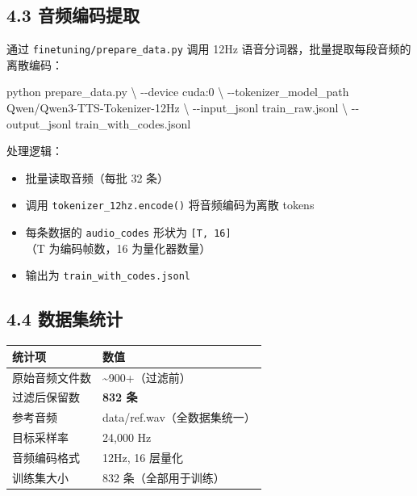 \documentclass[
  english,
  letterpaper,
  DIV=11,
  numbers=noendperiod]{scrartcl}
\newenvironment{Shaded}{\begin{snugshade}}{\end{snugshade}}
\newcommand{\AttributeTok}[1]{\textcolor[rgb]{0.40,0.45,0.13}{#1}}
\newcommand{\DataTypeTok}[1]{\textcolor[rgb]{0.68,0.00,0.00}{#1}}
\newcommand{\ExtensionTok}[1]{\textcolor[rgb]{0.00,0.23,0.31}{#1}}
\newcommand{\NormalTok}[1]{\textcolor[rgb]{0.00,0.23,0.31}{#1}}
\newcounter{none} %
\providecommand{\tightlist}{%
  \setlength{\itemsep}{0pt}\setlength{\parskip}{0pt}}
\begin{document}
\subsection{4.3
音频编码提取}\label{ux97f3ux9891ux7f16ux7801ux63d0ux53d6}

通过 \texttt{finetuning/prepare\_data.py} 调用 12Hz
语音分词器，批量提取每段音频的离散编码：

\begin{Shaded}
\begin{Highlighting}[]
\ExtensionTok{python}\NormalTok{ prepare\_data.py }\DataTypeTok{\textbackslash{}}
  \AttributeTok{{-}{-}device}\NormalTok{ cuda:0 }\DataTypeTok{\textbackslash{}}
  \AttributeTok{{-}{-}tokenizer\_model\_path}\NormalTok{ Qwen/Qwen3{-}TTS{-}Tokenizer{-}12Hz }\DataTypeTok{\textbackslash{}}
  \AttributeTok{{-}{-}input\_jsonl}\NormalTok{ train\_raw.jsonl }\DataTypeTok{\textbackslash{}}
  \AttributeTok{{-}{-}output\_jsonl}\NormalTok{ train\_with\_codes.jsonl}
\end{Highlighting}
\end{Shaded}

处理逻辑：

\begin{itemize}
\tightlist
\item
  批量读取音频（每批 32 条）
\item
  调用 \texttt{tokenizer\_12hz.encode()} 将音频编码为离散 tokens
\item
  每条数据的 \texttt{audio\_codes} 形状为 \texttt{{[}T,\ 16{]}}（T
  为编码帧数，16 为量化器数量）
\item
  输出为 \texttt{train\_with\_codes.jsonl}
\end{itemize}

\subsection{4.4 数据集统计}\label{ux6570ux636eux96c6ux7edfux8ba1}

{\def\LTcaptype{none} %
\begin{longtable}[]{@{}ll@{}}
\toprule\noalign{}
统计项 & 数值 \\
\midrule\noalign{}
\endhead
\bottomrule\noalign{}
\endlastfoot
原始音频文件数 & \textasciitilde900+（过滤前） \\
过滤后保留数 & \textbf{832 条} \\
参考音频 & data/ref.wav（全数据集统一） \\
目标采样率 & 24,000 Hz \\
音频编码格式 & 12Hz, 16 层量化 \\
训练集大小 & 832 条（全部用于训练） \\
\end{longtable}
}
\end{document}
